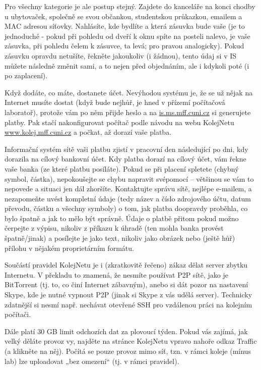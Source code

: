 Pro všechny kategorie je ale postup stejný. Zajdete do kanceláře na konci chodby
u ubytovaček, společně se svou občankou, studentskou průkazkou, emailem a MAC
adresou síťovky. Nahlásíte, kde bydlíte a která zásuvka bude vaše (je to
jednoduché - pokud při pohledu od dveří k oknu spíte na posteli nalevo, je vaše
zásuvka, při pohledu čelem k zásuvce, ta levá; pro pravou analogicky). Pokud
zásuvku opravdu netušíte, řekněte jakoukoliv (i žádnou), tento údaj si v IS
můžete následně změnit sami, a to nejen před objednáním, ale i kdykoli poté (i
po zaplacení).

Když dodáte, co máte, dostanete účet. Nevýhodou systému je, že se už nějak na
Internet musíte dostat (když bude nejhůř, je hned v přízemí počítačová
laboratoř), protože vám po něm přijde heslo a na \url{is.ms.mff.cuni.cz} si
generujete platby. Pak stačí nakonfigurovat počítač podle návodu na webu
KolejNetu \url{www.kolej.mff.cuni.cz} a počkat, až dorazí vaše platba.

Informační systém sítě vaši platbu zjistí v pracovní den následující po dni, kdy
dorazila na cílový bankovní účet. Kdy platba dorazí na cílový účet, vám řekne
vaše banka (ze které platbu posíláte). Pokud se při placení spletete (chybný
symbol, částka), nepokoušejte se chybu napravit svépomocí – většinou se vám to
nepovede a situaci jen dál zhoršíte. Kontaktujte správu sítě, nejlépe e-mailem,
a nezapomeňte uvést kompletní údaje (tedy název a číslo zdrojového účtu, datum
převodu, částku a všechny symboly) o tom, jak platba doopravdy proběhla, co bylo
špatně a jak to mělo být správně. Údaje o platbě přitom pokud možno čerpejte z
výpisu, nikoliv z příkazu k úhradě (ten mohla banka provést špatně/jinak) a
posílejte je jako text, nikoliv jako obrázek nebo (ještě hůř) přílohu v nějakém
proprietárním formátu.

Součástí pravidel KolejNetu je i (zkratkovitě řečeno) zákaz dělat server zbytku
Internetu. V překladu to znamená, že nesmíte používat P2P sítě, jako je
BitTorrent (tj. to, co činí Internet zábavným), anebo si dát pozor na nastavení
Skype, kde je nutné vypnout P2P (jinak si Skype z vás udělá server). Technicky
zdatnější si nesmí např. nechávat otevřené SSH pro vzdálenou práci na kolejním
počítači.

Dále platí 30 GB limit odchozích dat za plovoucí týden. Pokud vás zajímá, jak
velký děláte provoz vy, najděte na stránce KolejNetu vpravo nahoře odkaz Traffic
(a klikněte na něj). Počítá se pouze provoz mimo síť, tzn. v rámci koleje (mínus
lab) lze uploadovat „bez omezení“ (tj. v rámci pravidel).

